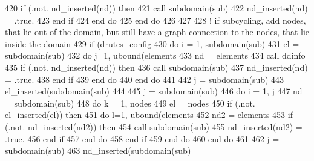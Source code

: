 \begin{DoxyCode}
420             \textcolor{keywordflow}{if} (.not. nd\_inserted(nd)) \textcolor{keywordflow}{then}
421               \textcolor{keyword}{call }subdomain(sub)%
422               nd\_inserted(nd) = .true.
423 \textcolor{keywordflow}{            end if}
424 \textcolor{keywordflow}{          end do}
425 \textcolor{keywordflow}{        end do}
426 
427         
428        \textcolor{comment}{! if subcycling, add nodes, that lie out of the domain, but still have a graph connection to the
       nodes, that lie inside the domain}
429         \textcolor{keywordflow}{if} (drutes_config%
430           \textcolor{keywordflow}{do} i = 1, subdomain(sub)%
431             el = subdomain(sub)%
432             \textcolor{keywordflow}{do} j=1, ubound(elements%
433               nd = elements%
434               \textcolor{keyword}{call }ddinfo%
435               \textcolor{keywordflow}{if} (.not. nd\_inserted(nd)) \textcolor{keywordflow}{then}
436                 \textcolor{keyword}{call }subdomain(sub)%
437                 nd\_inserted(nd) = .true.
438 \textcolor{keywordflow}{              end if}
439 \textcolor{keywordflow}{            end do}
440 \textcolor{keywordflow}{          end do}
441          
442           j = subdomain(sub)%
443           el\_inserted(subdomain(sub)%
444          
445           j = subdomain(sub)%
446           \textcolor{keywordflow}{do} i = 1, j
447             nd = subdomain(sub)%
448             \textcolor{keywordflow}{do} k = 1, nodes%
449               el = nodes%
450               \textcolor{keywordflow}{if} (.not. el\_inserted(el)) \textcolor{keywordflow}{then}
451                 \textcolor{keywordflow}{do} l=1, ubound(elements%
452                   nd2 = elements%
453                   \textcolor{keywordflow}{if} (.not. nd\_inserted(nd2)) \textcolor{keywordflow}{then}
454                     \textcolor{keyword}{call }subdomain(sub)%
455                     nd\_inserted(nd2) = .true.
456 \textcolor{keywordflow}{                  end if}
457 \textcolor{keywordflow}{                end do}
458 \textcolor{keywordflow}{              end if}
459 \textcolor{keywordflow}{            end do}
460 \textcolor{keywordflow}{          end do}
461           
462           j = subdomain(sub)%
463           nd\_inserted(subdomain(sub)%

\end{DoxyCode}
